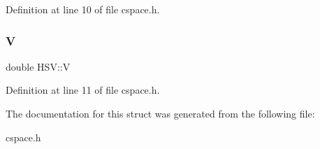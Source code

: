 Definition at line 10 of file cspace.\+h.

\mbox{\label{struct_h_s_v_aade636e6ce581e93de5374f0e5d77d7c}} 
\subsubsection{\texorpdfstring{V}{V}}
{\footnotesize\ttfamily double H\+S\+V\+::V}



Definition at line 11 of file cspace.\+h.



The documentation for this struct was generated from the following file\+:\begin{DoxyCompactItemize}
\item 
cspace.\+h\end{DoxyCompactItemize}
